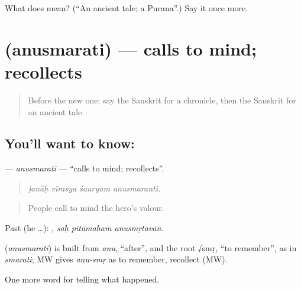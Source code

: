 \begin{tcolorbox}[breakable,colback=teal!4,colframe=teal!35!black,title={Before you move on}]
What does  mean? (\textquotedblleft{}An ancient tale; a Purana\textquotedblright{}.) Say it once more.
\end{tcolorbox}
\section[\texorpdfstring{\sk{अनुस्मरति} (anusmarati)}{अनुस्मरति (anusmarati)}]{ (anusmarati) — calls to mind; recollects}

\label{lesson:SA-C324-anusmarati}



\begin{quote}
Before the new one: say the Sanskrit for a chronicle, then the Sanskrit for an ancient tale.
\end{quote}

\subsection*{You'll want to know: }
\textbf{} — \emph{anusmarati} — \textquotedblleft{}calls to mind; recollects\textquotedblright{}.

\begin{quote}
   
\end{quote}

\begin{quote}
\emph{janāḥ vīrasya śauryam anusmaranti.}
\end{quote}

\begin{quote}
People call to mind the hero's valour.
\end{quote}

Past (he …):   , \emph{saḥ pitāmaham anusmṛtavān}.

\begin{cousinweb}
\textbf{} (\emph{anusmarati}) is built from \emph{anu}, \textquotedblleft{}after\textquotedblright{}, and the root √smṛ, \textquotedblleft{}to remember\textquotedblright{}, as in \emph{smarati}; MW gives \emph{anu-smṛ} as to remember, recollect (MW).
\end{cousinweb}

\begin{grammarlens}[title={What you've built}]
One more word for telling what happened.
\end{grammarlens}

